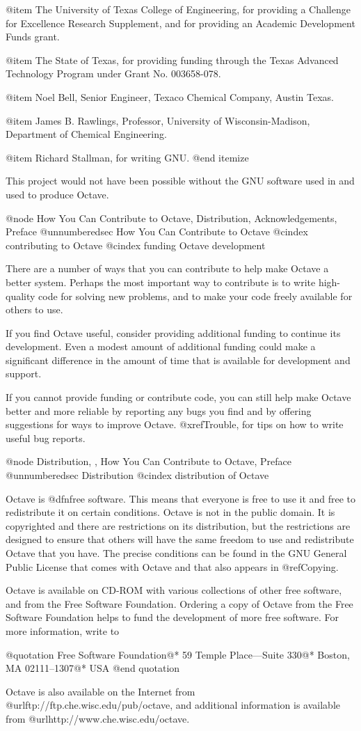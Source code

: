 @item
The University of Texas College of Engineering, for providing a
Challenge for Excellence Research Supplement, and for providing an
Academic Development Funds grant.

@item
The State of Texas, for providing funding through the Texas
Advanced Technology Program under Grant No. 003658-078.

@item
Noel Bell, Senior Engineer, Texaco Chemical Company, Austin Texas.

@item
James B. Rawlings, Professor, University of Wisconsin-Madison,
Department of Chemical Engineering.

@item
Richard Stallman, for writing GNU.
@end itemize

This project would not have been possible without the GNU software used
in and used to produce Octave.

@node How You Can Contribute to Octave, Distribution, Acknowledgements, Preface
@unnumberedsec How You Can Contribute to Octave
@cindex contributing to Octave
@cindex funding Octave development

There are a number of ways that you can contribute to help make Octave a
better system.  Perhaps the most important way to contribute is to write
high-quality code for solving new problems, and to make your code freely
available for others to use.

If you find Octave useful, consider providing additional funding to
continue its development.  Even a modest amount of additional funding
could make a significant difference in the amount of time that is
available for development and support.

If you cannot provide funding or contribute code, you can still help
make Octave better and more reliable by reporting any bugs you find and
by offering suggestions for ways to improve Octave.  @xref{Trouble}, for
tips on how to write useful bug reports.

@node Distribution,  , How You Can Contribute to Octave, Preface
@unnumberedsec Distribution
@cindex distribution of Octave

Octave is @dfn{free} software.  This means that everyone is free to
use it and free to redistribute it on certain conditions.  Octave is not
in the public domain.  It is copyrighted and there are restrictions on
its distribution, but the restrictions are designed to ensure that
others will have the same freedom to use and redistribute Octave that
you have.  The precise conditions can be found in the GNU General Public
License that comes with Octave and that also appears in @ref{Copying}.

Octave is available on CD-ROM with various collections of other free
software, and from the Free Software Foundation.  Ordering a copy of
Octave from the Free Software Foundation helps to fund the development
of more free software.  For more information, write to

@quotation
Free Software Foundation@*
59 Temple Place---Suite 330@*
Boston, MA 02111--1307@*
USA
@end quotation
 
Octave is also available on the Internet from
@url{ftp://ftp.che.wisc.edu/pub/octave}, and additional information is
available from @url{http://www.che.wisc.edu/octave}.
